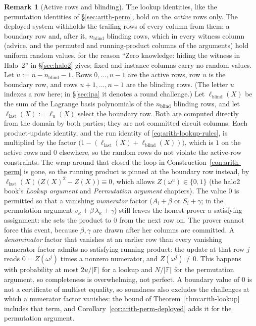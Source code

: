 \documentclass[11pt,a4paper]{article}
\theoremstyle{definition}
\newtheorem{remark}[theorem]{Remark}
\newcommand{\F}{\mathbb{F}}
\begin{document}
\begin{remark}[Active rows and blinding]\label{rem:active-rows}
The lookup identities, like the permutation identities of
\S\ref{sec:arith-perm}, hold on the \emph{active} rows only. The deployed
system withholds the trailing rows of every column from them: a boundary
row and, after it, $n_{\mathrm{blind}}$ blinding rows, which in every
witness column (advice, and the permuted and running-product columns of
the arguments) hold uniform random values, for the reason ``Zero
knowledge: hiding the witness in Halo~2'' in \S\ref{sec:halo2} gives;
fixed and instance columns carry no random values. Let
$u := n - n_{\mathrm{blind}} - 1$. Rows $0, \dots, u - 1$ are the active
rows, row $u$ is the boundary row, and rows $u + 1, \dots, n - 1$ are the
blinding rows. (The letter $u$ indexes a row here; in \S\ref{sec:ipa} it
denotes a round challenge.) Let $\ell_{\mathrm{blind}}(X)$ be the sum of
the Lagrange basis polynomials of the $n_{\mathrm{blind}}$ blinding rows,
and let $\ell_{\mathrm{last}}(X) := \ell_u(X)$ select the boundary row.
Both are computed
directly from the domain by both parties; they are not committed circuit
columns. Each product-update identity, and the run identity of
\eqref{eq:arith-lookup-rules}, is multiplied by the factor
$\bigl(1 - (\ell_{\mathrm{last}}(X) + \ell_{\mathrm{blind}}(X))\bigr)$,
which is $1$ on the active rows and $0$ elsewhere, so the random rows do
not violate the active-row constraints. The wrap-around that closed the
loop in Construction~\ref{con:arith-perm} is gone, so the running product
is pinned at the boundary row instead, by
$\ell_{\mathrm{last}}(X)\,\bigl(Z(X)^2 - Z(X)\bigr) \equiv 0$, which
allows $Z(\omega^u) \in \{0, 1\}$ (the halo2 book's \emph{Lookup argument}
and \emph{Permutation argument} chapters). The value $0$ is permitted so
that a vanishing \emph{numerator} factor ($A_i + \beta$ or $S_i + \gamma$;
in the permutation argument $v_\kappa + \beta\,\lambda_\kappa + \gamma$)
still leaves the honest prover a satisfying assignment: she sets the
product to $0$ from the next row on. The prover cannot force this event,
because $\beta, \gamma$ are drawn after her columns are committed. A
\emph{denominator} factor that vanishes at an earlier row than every
vanishing numerator factor admits no satisfying running product: the
update at that row $j$ reads $0 = Z(\omega^j)$ times a nonzero numerator,
and $Z(\omega^j) \ne 0$. This happens
with probability at most $2u/|\F|$ for a lookup and $N/|\F|$ for the
permutation argument, so completeness is overwhelming, not perfect. A
boundary value of $0$ is not
a certificate of multiset equality, so soundness also excludes the
challenges at which a numerator factor vanishes: the bound of
Theorem~\ref{thm:arith-lookup} includes that term, and
Corollary~\ref{cor:arith-perm-deployed} adds it for the permutation
argument.
\end{remark}
\end{document}
